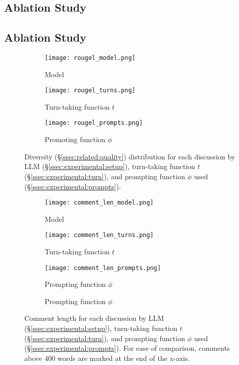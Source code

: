 \subsection{Ablation Study}
\subsection{Ablation Study}
\label{ssec:results:ablation}

\begin{figure*}[t]
    \begin{subfigure}{0.32\linewidth}
        \texttt{[image: rougel\_model.png]}
        \caption{Model}
        \label{fig:rougel_model}
    \end{subfigure}%
    \hfill
    \begin{subfigure}{0.32\linewidth}
        \texttt{[image: rougel\_turns.png]}
        \caption{Turn-taking function $t$}
        \label{fig:rougel_turns}
    \end{subfigure}%
    \hfill
    \begin{subfigure}{0.32\linewidth}
        \texttt{[image: rougel\_prompts.png]}
        \caption{Promoting function $\phi$}
        \label{fig:rougel_prompts}
    \end{subfigure}%

    \caption{Diversity (\S\ref{ssec:related:quality}) distribution for each discussion by \ac{LLM} (\S\ref{ssec:experimental:setup}), turn-taking function $t$ (\S\ref{ssec:experimental:turn}), and prompting function $\phi$ used (\S\ref{ssec:experimental:prompts}).}
    \label{fig:diversity}
\end{figure*}

\begin{figure*}[t]
    \begin{subfigure}{0.32\linewidth}
        \texttt{[image: comment\_len\_model.png]}
        \caption{Model}
        \label{fig:comment_length_model}
    \end{subfigure}%
    \hfill
    \begin{subfigure}{0.32\linewidth}
        \texttt{[image: comment\_len\_turns.png]}
        \caption{Turn-taking function $t$}
        \label{fig:comment_length_turns}
    \end{subfigure}%
    \hfill
    \begin{subfigure}{0.32\linewidth}
        \texttt{[image: comment\_len\_prompts.png]}
        \caption{Prompting function $\phi$}
        \caption{Prompting function $\phi$}
        \label{fig:comment_length_prompts}
    \end{subfigure}%

    \caption{Comment length for each discussion by \ac{LLM} (\S\ref{ssec:experimental:setup}), turn-taking function $t$ (\S\ref{ssec:experimental:turn}), and prompting function $\phi$ used (\S\ref{ssec:experimental:prompts}). For ease of comparison, comments above 400 words are marked at the end of the x-axis.}
    \label{fig:comment_length}
\end{figure*}


